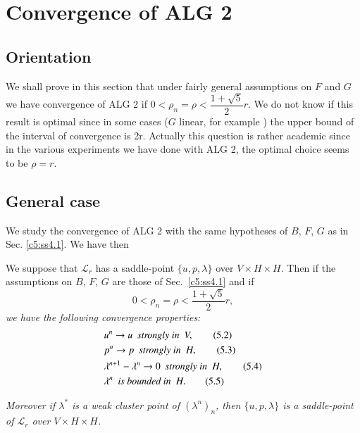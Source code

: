 \section{Convergence of ALG 2}\label{c5:s5}%

\subsection{Orientation}\label{c5:ss5.1}%

 We shall prove in this section  that under fairly general assumptions on $F$ and $G$we have convergence of ALG 2 if $0 < \rho_n = \rho < \dfrac{1 + \sqrt{5}}{2}r$.  
We do not know if this result is optimal since in some cases ($G$ linear, for example ) the upper bound of the interval of convergence is 2r.  Actually this question is rather academic since in the various experiments we have done with ALG 2,  the optimal choice seems  to be $\rho =r$.  

\subsection{General case}\label{c5:ss5.2}%

We study the convergence of ALG 2 with the same hypotheses  of $B$, 
$F$, $G$ as in Sec. \ref{c5:ss4.1}.  We have then  

\begin{theorem}\label{c5:thm5.1}%
  We suppose that $\mathscr{L}_r$ has a saddle-point $\{u, p, \lambda\}$ over $V \times H \times H$.  
  Then if the assumptions on $B$, $F$, $G$ are those of 
  Sec.~\ref{c5:ss4.1} and if 
\begin{equation}
0 < \rho_n = \rho < \frac{1 + \sqrt{5}}{2} r, \tag{5.1}\label{c5:eq5.1}
\end{equation}\pageoriginale 
\textit{we have the following convergence properties:}
\begin{align}
& u^n \rightarrow u ~~\text{\em strongly in}~~V, \tag{5.2}\label{c5:eq5.2}\\
& p^n \rightarrow p ~~\text{\em strongly in}~~H,  \tag{5.3}\label{c5:eq5.3}\\
& \lambda^{n+1} - \lambda^n \rightarrow 0 ~~\text{\em strongly in}~~H, \tag{5.4}\label{c5:eq5.4}\\
&\lambda^n~~\text{\em is bounded in}~~H. \tag{5.5}\label{c5:eq5.5}
\end{align}
\end{theorem}
\textit{Moreover if $\lambda^*$ is a weak cluster point of $(\lambda^n)_n$,  then $\{u, p, \lambda\}$  is a saddle-point of $\mathscr{L}_r$ over $V \times H \times H$.}

